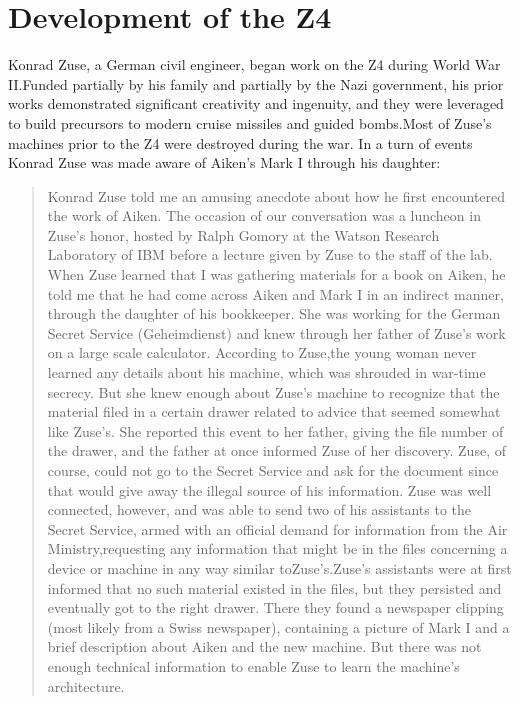 \section{Development of the Z4}
Konrad Zuse, a German civil engineer, began work on the Z4 during World War
II.Funded partially by his family and partially by the Nazi government, his
prior works demonstrated significant creativity and ingenuity, and they were
leveraged to build precursors to modern cruise missiles and guided bombs.Most of
Zuse's machines prior to the Z4 were destroyed during the war.  In a turn of events Konrad Zuse was made
aware of Aiken's Mark I through his daughter:
\begin{quotation}
  Konrad Zuse told me an amusing anecdote about how he first
  encountered the work of Aiken. The occasion of our conversation was
  a luncheon in Zuse's honor, hosted by Ralph Gomory at the Watson
  Research Laboratory of IBM before a lecture given by Zuse to the
  staff of the lab. When Zuse learned that I was gathering materials
  for a book on Aiken, he told me that he had come across Aiken and
  Mark I in an indirect manner, through the daughter of his
  bookkeeper. She was working for the German Secret
  Service (Geheimdienst) and knew through her father of Zuse's work on
  a large scale calculator. According to Zuse,the young woman never
  learned any details about his machine, which was shrouded in
  war-time secrecy. But she knew enough about Zuse's machine to
  recognize that the material filed in a certain drawer related to
  advice that seemed somewhat like Zuse's. She reported this event
  to her father, giving the file number of the drawer, and the father
  at once informed Zuse of her discovery. Zuse, of course, could not
  go to the Secret Service and ask for the document since that would
  give away the illegal source of his information. Zuse was well
  connected, however, and was able to send two of his assistants to
  the Secret Service, armed with an official demand for information
  from the Air Ministry,requesting any information that might be in
  the files concerning a device or machine in any way similar
  toZuse's.Zuse's assistants were at first informed that no such
  material existed in the files, but they persisted and eventually got
  to the right drawer. There they found a newspaper clipping (most
  likely from a Swiss newspaper), containing a picture of Mark I and a
  brief description about Aiken and the new machine. But there was not
  enough technical information to enable Zuse to learn the machine's
  architecture.
  \cite{howard_aiken_and_the_dawn_of_the_computer_age_2000}
\end{quotation}
